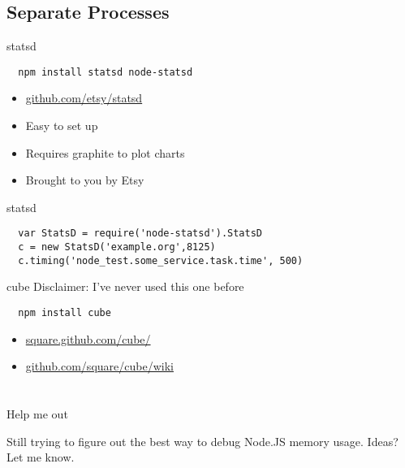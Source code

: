 \documentclass{beamer}
\begin{document}
\subsection{Separate Processes}

\begin{frame}[fragile]{statsd}
\begin{verbatim}
  npm install statsd node-statsd
\end{verbatim}
\begin{itemize}
  \item \href{https://github.com/etsy/statsd}{github.com/etsy/statsd}
  \item Easy to set up
  \item Requires graphite to plot charts
  \item Brought to you by Etsy
\end{itemize}
\end{frame}

\begin{frame}[fragile]{statsd}
\begin{verbatim}
  var StatsD = require('node-statsd').StatsD
  c = new StatsD('example.org',8125)
  c.timing('node_test.some_service.task.time', 500)
\end{verbatim}
\end{frame}

\begin{frame}[fragile]{cube}
Disclaimer: I've never used this one before
\begin{verbatim}
  npm install cube
\end{verbatim}
\begin{itemize}
  \item \href{http://square.github.com/cube/}{square.github.com/cube/}
  \item \href{https://github.com/square/cube/wiki}{github.com/square/cube/wiki}
\end{itemize}
\end{frame}

\section{}

\begin{frame}{Help me out}
\begin{center}
Still trying to figure out the best way to debug Node.JS memory usage. Ideas? Let me know.
\end{center}
\end{frame}
\end{document}
